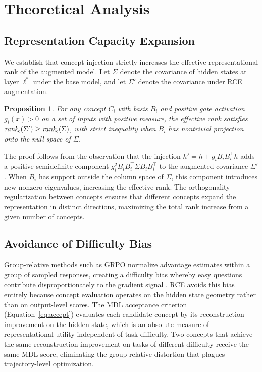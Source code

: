 \documentclass[11pt]{article}
\newtheorem{proposition}{Proposition}
\begin{document}
\section{Theoretical Analysis}

\subsection{Representation Capacity Expansion}

We establish that concept injection strictly increases the effective representational rank of the augmented model. Let $\Sigma$ denote the covariance of hidden states at layer $\ell^*$ under the base model, and let $\Sigma'$ denote the covariance under RCE augmentation.

\begin{proposition}
For any concept $C_i$ with basis $B_i$ and positive gate activation $g_i(x) > 0$ on a set of inputs with positive measure, the effective rank satisfies $\emph{rank}_\epsilon(\Sigma') \geq \emph{rank}_\epsilon(\Sigma)$, with strict inequality when $B_i$ has nontrivial projection onto the null space of $\Sigma$.
\end{proposition}

The proof follows from the observation that the injection $h' = h + g_i B_i B_i^\top h$ adds a positive semidefinite component $g_i^2 B_i B_i^\top \Sigma B_i B_i^\top$ to the augmented covariance $\Sigma'$. When $B_i$ has support outside the column space of $\Sigma$, this component introduces new nonzero eigenvalues, increasing the effective rank. The orthogonality regularization between concepts ensures that different concepts expand the representation in distinct directions, maximizing the total rank increase from a given number of concepts.

\subsection{Avoidance of Difficulty Bias}

Group-relative methods such as GRPO normalize advantage estimates within a group of sampled responses, creating a difficulty bias whereby easy questions contribute disproportionately to the gradient signal \cite{zhang2025disco}. RCE avoids this bias entirely because concept evaluation operates on the hidden state geometry rather than on output-level scores. The MDL acceptance criterion (Equation~\ref{eq:accept}) evaluates each candidate concept by its reconstruction improvement on the hidden state, which is an absolute measure of representational utility independent of task difficulty. Two concepts that achieve the same reconstruction improvement on tasks of different difficulty receive the same MDL score, eliminating the group-relative distortion that plagues trajectory-level optimization.
\end{document}
